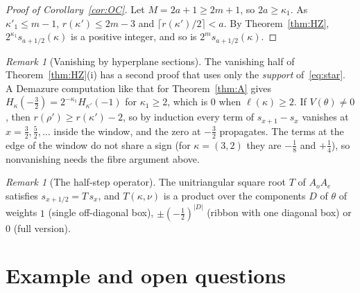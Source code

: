 \documentclass[submission]{FPSAC2027}
\theoremstyle{definition}
\theoremstyle{remark}
\newtheorem{remark}[theorem]{Remark}
\begin{document}
\begin{proof}[Proof of Corollary~\ref{cor:OC}]
Let $M=2a+1\ge2m+1$, so $2a\ge\kappa_1$. As $\kappa'_1\le m-1$,
$r(\kappa')\le2m-3$ and $\lceil r(\kappa')/2\rceil<a$. By Theorem~\ref{thm:HZ},
$2^{\kappa_1}s_{a+1/2}(\kappa)$ is a positive integer, and so is $2^ms_{a+1/2}(\kappa)$.
\end{proof}

\begin{remark}[Vanishing by hyperplane sections]\label{rem:Z}
The vanishing half of Theorem~\ref{thm:HZ}(i) has a second proof that uses only the
\emph{support} of~\eqref{eq:star}. A Demazure computation like that for Theorem~\ref{thm:A} gives
$H_\kappa(-\tfrac32)=2^{-\kappa_1}H_{\kappa'}(-1)$ for $\kappa_1\ge2$, which is $0$ when
$\ell(\kappa)\ge2$. If $V(\theta)\ne0$, then $r(\rho')\ge r(\kappa')-2$, so by induction every term of
$s_{x+1}-s_x$ vanishes at $x=\tfrac32,\tfrac52,\dots$ inside the window, and the zero at
$-\tfrac32$ propagates. The terms at the edge of the window do not share a sign (for
$\kappa=(3,2)$ they are $-\tfrac18$ and $+\tfrac14$), so nonvanishing needs the fibre argument above.
\end{remark}

\begin{remark}[The half-step operator]\label{rem:T}
The unitriangular square root $T$ of $A_oA_e$ satisfies $s_{x+1/2}=T\,s_x$, and $T(\kappa,\nu)$ is
a product over the components $D$ of $\theta$ of weights $1$ (single off-diagonal box),
$\pm(-\tfrac12)^{|D|}$ (ribbon with one diagonal box) or $0$ (full version).
\end{remark}

\section{Example and open questions}\label{sec:examples}
\end{document}
